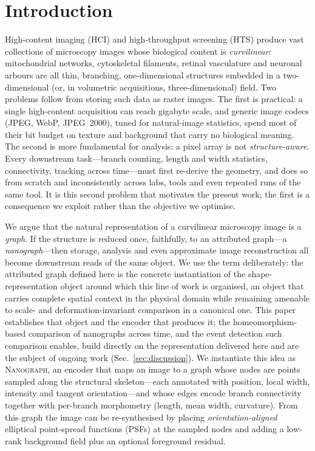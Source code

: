 \documentclass[10pt,a4paper]{article}
\newcommand{\method}{\textnormal{\textsc{Nanograph}}\xspace}
\begin{document}
\section{Introduction}\label{sec:intro}
High-content imaging (HCI) and high-throughput screening (HTS) produce vast
collections of microscopy images whose biological content is
\emph{curvilinear}: mitochondrial networks, cytoskeletal filaments, retinal
vasculature and neuronal arbours are all thin, branching, one-dimensional
structures embedded in a two-dimensional (or, in volumetric acquisitions,
three-dimensional) field. Two problems follow from storing such data as raster
images. The first is practical: a single high-content acquisition can reach
gigabyte scale, and generic image codecs (JPEG, WebP, JPEG~2000), tuned for
natural-image statistics, spend most of their bit budget on texture and
background that carry no biological meaning. The second is more fundamental
for analysis: a pixel array is not \emph{structure-aware}. Every downstream
task---branch counting, length and width statistics, connectivity, tracking
across time---must first re-derive the geometry, and does so from scratch and
inconsistently across labs, tools and even repeated runs of the same tool.
It is this second problem that motivates the present work; the first is a
consequence we exploit rather than the objective we optimise.

We argue that the natural representation of a curvilinear microscopy image is a
\emph{graph}. If the structure is reduced once, faithfully, to an attributed
graph---a \emph{nanograph}---then storage, analysis and even approximate image
reconstruction all become downstream reads of the same object. We use the term
deliberately: the attributed graph defined here is the concrete instantiation
of the shape-representation object around which this line of work is
organised, an object that carries complete spatial context in the physical
domain while remaining amenable to scale- and deformation-invariant comparison
in a canonical one. This paper establishes that object and the encoder that
produces it; the homeomorphism-based comparison of nanographs across time, and
the event detection such comparison enables, build directly on the
representation delivered here and are the subject of ongoing work
(Sec.~\ref{sec:discussion}). We instantiate this idea as
\method, an encoder that maps an image to a graph whose nodes are points sampled
along the structural skeleton---each annotated with position, local width,
intensity and tangent orientation---and whose edges encode branch connectivity
together with per-branch morphometry (length, mean width, curvature). From this
graph the image can be re-synthesised by placing \emph{orientation-aligned}
elliptical point-spread functions (PSFs) at the sampled nodes and adding a
low-rank background field plus an optional foreground residual.
\end{document}
